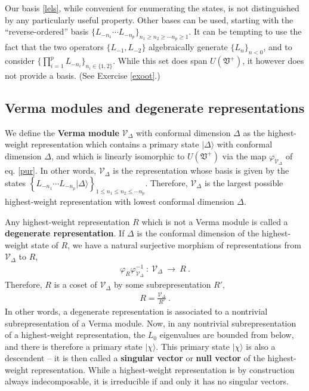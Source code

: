 \documentclass[12pt,a4paper,notitlepage]{report}
\numberwithin{equation}{section}
\theoremstyle{break}
\begin{document}
Our basis \eqref{lels}, while convenient for enumerating the states, is not distinguished by any particularly useful property.
Other bases can be used, starting with the ``reverse-ordered'' basis $\{ L_{-n_1} \cdots L_{-n_p} \}_{n_1\geq n_2\geq \cdots n_p\geq 1} $.
It can be tempting to use the fact that the two operators $\{L_{-1},L_{-2}\}$ algebraically generate $\{L_{n}\}_{n<0}$, and to consider $\{\prod_{i=1}^p L_{-n_i}\}_{n_i\in\{1,2\}}$.
While this set does span $U(\mathfrak{V}^+)$, it however does not provide a basis. (See Exercise \ref{exoot}.)

\subsection{Verma modules and degenerate representations \label{secvm}}

We define the \textbf{\boldmath Verma module} $\mathcal{V}_\Delta$ with conformal dimension $\Delta$ as the highest-weight representation which contains a primary state $|\Delta\rangle$ with conformal dimension $\Delta$, and which is linearly isomorphic to $U(\mathfrak{V}^+)$ via the map $\varphi_{\mathcal{V}_\Delta}$ of eq. \eqref{pur}.
In other words, $\mathcal{V}_\Delta$ is the representation whose basis is given by the states  $\left\{ L_{-n_1} \cdots L_{-n_p}|\Delta\rangle\right\}_{1\leq n_1\leq n_2\leq \cdots n_p}$.
Therefore, $\mathcal{V}_\Delta$ is the largest possible highest-weight representation with lowest conformal dimension $\Delta$. 

Any  highest-weight representation $R$ which is not a Verma module is called a \textbf{\boldmath degenerate representation}.
If $\Delta$ is the conformal dimension of the highest-weight state of $R$, we have a natural surjective morphism of representations from $\mathcal{V}_\Delta$ to $R$,
\begin{align}
\varphi_R \varphi_{\mathcal{V}_\Delta}^{-1}\ : \  \mathcal{V}_\Delta\ \rightarrow\ R \ .
\end{align}
Therefore, $R$ is a coset of $\mathcal{V}_\Delta$ by some subrepresentation $R'$,
\begin{align}
 R = \frac{\mathcal{V}_\Delta}{R'}\ .
\label{rvrp}
\end{align}
In other words, a degenerate representation is associated to a nontrivial subrepresentation of a Verma module.
Now, in any nontrivial subrepresentation of a highest-weight representation, the $L_0$ eigenvalues are bounded from below, and there is therefore a primary state $|\chi\rangle$.
This primary state $|\chi\rangle$ is also a descendent -- it is then called a \textbf{\boldmath singular vector} or \textbf{\boldmath null vector} of the highest-weight representation.
While a highest-weight representation is by construction always indecomposable, it is irreducible if and only it has no singular vectors.
\end{document}
